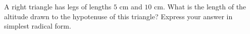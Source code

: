 A right triangle has legs of lengths $5$ cm and $10$ cm. What is the length of the altitude drawn to the hypotenuse of this triangle? Express your answer in simplest radical form.
